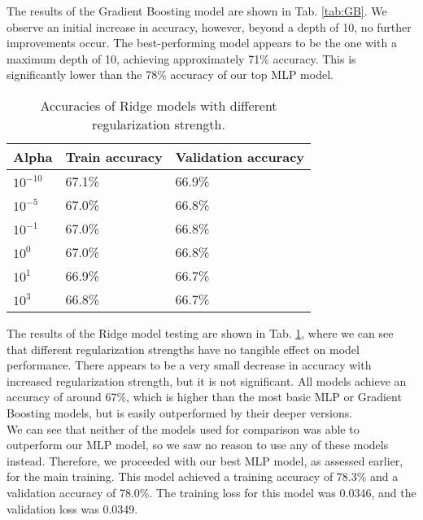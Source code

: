 The results of the Gradient Boosting model are shown in Tab. \ref{tab:GB}. We observe an initial increase in accuracy, however, beyond a depth of 10, no further improvements occur. The best-performing model appears to be the one with a maximum depth of 10, achieving approximately 71\% accuracy. This is significantly lower than the 78\% accuracy of our top MLP model.
\\

\begin{table}[!h]
	\centering
	\begin{tabular}{|l|l|l|}
		\hline
		Alpha      & Train accuracy & Validation accuracy \\ \hline
		$10^{-10}$ & 67.1\%         & 66.9\%              \\ \hline
		$10^{-5}$  & 67.0\%         & 66.8\%              \\ \hline
		$10^{-1}$  & 67.0\%         & 66.8\%              \\ \hline
		$10^{0}$   & 67.0\%         & 66.8\%              \\ \hline
		$10^{1}$   & 66.9\%         & 66.7\%              \\ \hline
		$10^{3}$   & 66.8\%         & 66.7\%              \\ \hline
	\end{tabular}
	\caption{Accuracies of Ridge models with different regularization strength.}
	\label{tab:Ridge}
\end{table}

The results of the Ridge model testing are shown in Tab. \ref{tab:Ridge}, where we can see that different regularization strengths have no tangible effect on model performance. There appears to be a very small decrease in accuracy with increased regularization strength, but it is not significant. All models achieve an accuracy of around 67\%, which is higher than the most basic MLP or Gradient Boosting models, but is easily outperformed by their deeper versions.
\\

We can see that neither of the models used for comparison was able to outperform our MLP model, so we saw no reason to use any of these models instead. Therefore, we proceeded with our best MLP model, as assessed earlier, for the main training. This model achieved a training accuracy of 78.3\% and a validation accuracy of 78.0\%. The training loss for this model was 0.0346, and the validation loss was 0.0349.
